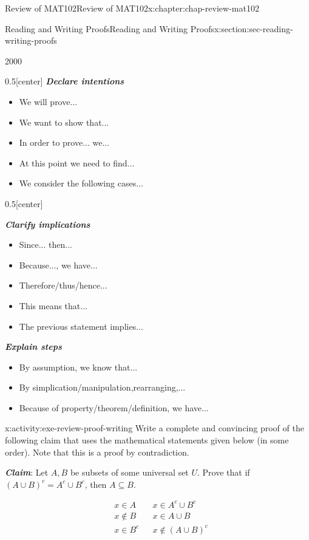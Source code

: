 \documentclass[oneside,10pt,]{book}
\newcommand{\alert}[1]{\textbf{\textit{#1}}}
\numberwithin{equation}{section}
\newcommand{\amp}{&}
\begin{document}
\begin{chapterptx}{Review of MAT102}{}{Review of MAT102}{}{}{x:chapter:chap-review-mat102}
\begin{sectionptx}{Reading and Writing Proofs}{}{Reading and Writing Proofs}{}{}{x:section:sec-reading-writing-proofs}
\begin{sidebyside}{2}{0}{0}{0}%
\begin{sbspanel}{0.5}[center]%
\alert{Declare intentions}%
\begin{itemize}[label=\textbullet]
\item{}We will prove...%
\item{}We want to show that...%
\item{}In order to prove... we...%
\item{}At this point we need to find...%
\item{}We consider the following cases...%
\end{itemize}
%
\end{sbspanel}%
\begin{sbspanel}{0.5}[center]%
\par
\alert{Clarify implications}%
\begin{itemize}[label=\textbullet]
\item{}Since... then...%
\item{}Because..., we have...%
\item{}Therefore\slash{}thus\slash{}hence...%
\item{}This means that...%
\item{}The previous statement implies...%
\end{itemize}
%
\end{sbspanel}%
\end{sidebyside}%
\par
\alert{Explain steps}%
\begin{itemize}[label=\textbullet]
\item{}By assumption, we know that...%
\item{}By simplication\slash{}manipulation,rearranging,...%
\item{}Because of property\slash{}theorem\slash{}definition, we have...%
\end{itemize}
%
\begin{activity}{}{x:activity:exe-review-proof-writing}%
Write a complete and convincing proof of the following claim that uses the mathematical statements given below (in some order). Note that this is a proof by contradiction.%
\par
\alert{Claim}: Let \(A, B\) be subsets of some universal set \(U\). Prove that if \((A \cup B)^c = A^c \cup B^c\), then \(A \subseteq B\).%
\par
%
\begin{align*}
\amp x \in A \amp \amp x \in A^c \cup B^c\\
\amp x \not\in B \amp \amp x \in A \cup B\\
\amp x \in B^c \amp \amp x \not\in (A \cup B)^c
\end{align*}
%
\end{activity}
\end{sectionptx}
\end{chapterptx}
\end{document}
